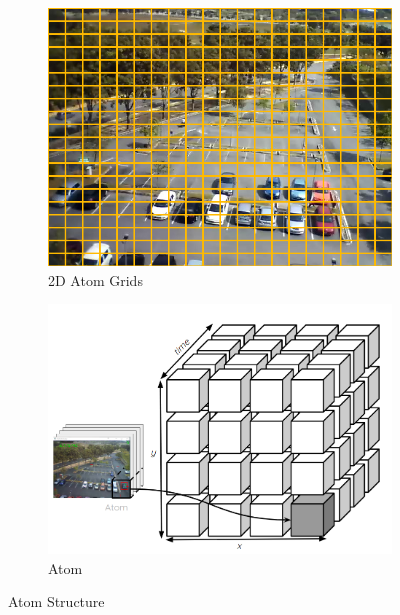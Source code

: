 \documentclass[runningheads]{llncs}
\begin{document}
\begin{figure}[!t]
\centering
\begin{subfigure}{0.42\textwidth}
\includegraphics[width=\textwidth]{Images/grids2.png}
\caption{2D Atom Grids} \label{fig:grids}
\end{subfigure}
\begin{subfigure}{0.42\textwidth}
\includegraphics[width=\textwidth]{Images/atom.PNG}
\caption{Atom} \label{fig:atom}
\end{subfigure}
\caption{Atom Structure} \label{fig:atom_struct}
\vspace{-1em}
\end{figure}
 
\end{document}
